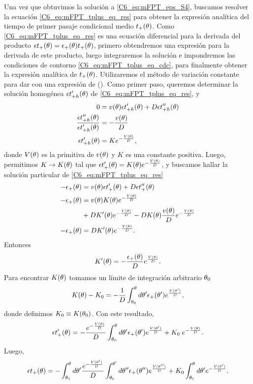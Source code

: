 \documentclass[./main.tex]{subfiles}
\begin{document}
Una vez que obtuvimos la solución a \ref{C6_eq:mFPT_eps_S4}, buscamos resolver la ecuación \ref{C6_eq:mFPT_tplus_eq_res} para obtener la expresión analítica del tiempo de primer pasaje condicional medio $t_{+}(\theta)$. Como \ref{C6_eq:mFPT_tplus_eq_res} es una ecuación diferencial para la derivada del producto $ \epsilon t_+(\theta) = \epsilon_{+}(\theta) t_{+}(\theta) $,  primero obtendremos una expresión para la derivada de este producto, luego integraremos la solución e impondremos las condiciones de contorno \ref{C6_eq:mFPT_tplus_eq_cdc}, para finalmente obtener la expresión analítica de  $t_{+}(\theta)$. Utilizaremos el método de variación constante para dar con una expresión de \Depstplus(\xx). Como primer paso, queremos determinar la solución homogénea $\epsilon t_{+h} '(\theta)$ de \ref{C6_eq:mFPT_tplus_eq_res}, y
\begin{align}
    0 &= v(\theta) \epsilon t_{+h} '(\theta)  + D \epsilon t_{+h} ''(\theta) \nonumber \\
    \frac{\epsilon t_{+h} ''(\theta)}{\epsilon t_{+h} '(\theta)} &= - \frac{v(\theta)}{D} \nonumber \\
    \epsilon t_{+h} '(\theta) & = K  e^{- \frac{V(\theta)}{D}},
\end{align}
donde $V(\theta)$ es la primitiva de $v(\theta)$ y $K$ es una constante positiva.
Luego, permitimos $K \rightarrow   K(\theta)$ tal que $\epsilon t_+ '(\theta) = K(\theta) e^{- \frac{V(\theta)}{D}}$, y buscamos hallar la solución particular de \ref{C6_eq:mFPT_tplus_eq_res}
\begin{align}
    - \epsilon_{+}(\theta) &= v(\theta) \epsilon t_+ '(\theta) + D \epsilon t_+ ''(\theta) \nonumber \\
    - \epsilon_{+}(\theta) &= v(\theta) K(\theta) e^{- \frac{V(\theta)}{D}}  \nonumber \\
    & + D K'(\theta)e^{- \frac{V(\theta)}{D}} - D K(\theta) \frac{v(\theta)}{D} e^{- \frac{V(\theta)}{D}} \nonumber \\
    - \epsilon_{+}(\theta) &=  D K'(\theta)e^{- \frac{V(\theta)}{D}} .
\end{align}
Entonces
\begin{align}
         K'(\theta) = - \frac{\epsilon_{+}(\theta)}{D} e^{ \frac{V(\theta)}{D}} .
\end{align}
Para encontrar $K(\theta)$ tomamos un límite de integración arbitrario $\theta_{0}$
\begin{align}
         K(\theta) - K_0 = - \frac{1}{D} \int_{\theta_0}^\theta d\theta' \epsilon_{+}(\theta') e^{ \frac{V(\theta')}{D}},
\end{align}
donde definimos $K_0 \equiv K(\theta_0)$. Con este resultado, 
\begin{align}
    \epsilon t_+ '(\theta) = - \frac{e^{- \frac{V(\theta)}{D}}}{D} \int_{\theta_0}^\theta d\theta' \epsilon_{+}(\theta') e^{ \frac{V(\theta')}{D}} + K_0 \; e^{- \frac{V(\theta)}{D}} .
\end{align}
Luego, 
\begin{align}
   \epsilon t_+(\theta) = - \int_{\theta_1}^{\theta} d\theta'  \frac{ e^{- \frac{V(\theta')}{D}} }{D} \int_{\theta_0}^{\theta'} d \theta'' \epsilon_{+}(\theta'') e^{ \frac{V(\theta'')}{D}} + K_0 \int_{\theta_1}^{\theta} d\theta'  e^{- \frac{V(\theta')}{D}}  .
\end{align}
\end{document}
